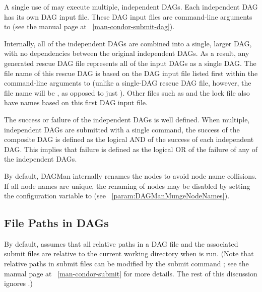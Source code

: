 A single use of  may execute multiple, independent DAGs.
Each independent DAG has its own DAG input file.
These DAG input files are command-line arguments to
(see the  manual page at ~\ref{man-condor-submit-dag}).

Internally, all of the independent DAGs are combined
into a single, larger DAG, with no dependencies between
the original independent DAGs.
As a result,
any generated rescue DAG file represents all of the input DAGs
as a single DAG.
The file name of this rescue DAG is based on the DAG input file
listed first within the command-line arguments to
 (unlike a single-DAG rescue DAG file, however,
the file name will be
, as opposed to
just ).
Other files such
as  and the lock file also have names based on this
first DAG input file.

The success or failure of the independent DAGs is well defined.
When multiple, independent DAGs are submitted with a single
command, the
success of the composite DAG is defined as the logical AND
of the success of each independent DAG.
This implies that failure is defined as the logical OR
of the failure of any of the independent DAGs.

By default, DAGMan internally renames the nodes to avoid node name collisions.  
If all node names are unique, 
the renaming of nodes may be disabled by
setting the configuration variable 
to  (see ~\ref{param:DAGManMungeNodeNames}).

\subsection{\label{sec:DAGPaths}File Paths in DAGs}

By default,  assumes that all relative paths in a
DAG file and the associated submit files are relative to the current
working directory when  is run.  (Note that 
relative paths in submit files can be modified by the submit command
; see the  manual page at
~\ref{man-condor-submit} for more details.  The rest of this discussion
ignores .)

